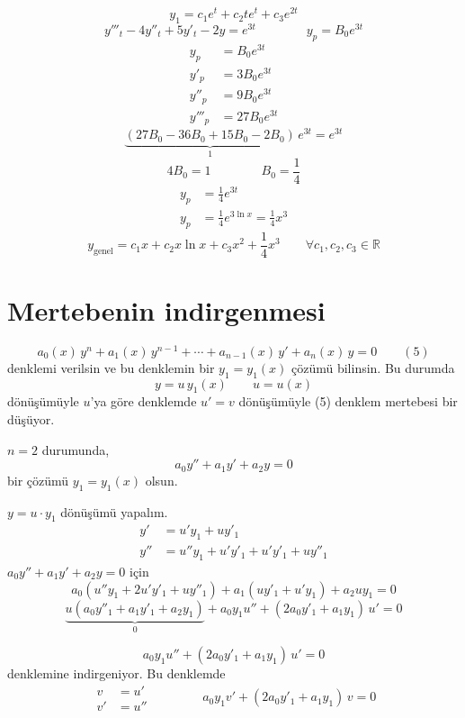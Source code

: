 \documentclass[11pt,a4paper]{article}
\begin{document}
\[ y_1 = c_1e^t + c_2te^t + c_3e^{2t} \]
\[ y'''_t - 4y''_t + 5y'_t - 2y = e^{3t} \qquad\qquad y_p = B_0e^{3t} \]
\begin{align*}
y_p &= B_0e^{3t}\\
y'_p &= 3B_0e^{3t}\\
y''_p &= 9B_0e^{3t}\\
y'''_p &= 27B_0e^{3t}
\end{align*}
\[ \underbrace{(27B_0 - 36B_0 + 15B_0 - 2B_0)}_{1}\,e^{3t} = e^{3t} \]
\[ 4B_0 = 1 \qquad\qquad B_0 = \frac{1}{4} \]
\begin{align*}
y_p &= \frac{1}{4}e^{3t}\\
y_p &= \frac{1}{4}e^{3\ln x} = \frac{1}{4}x^3
\end{align*}
\[ y_{\text{genel}} = c_1x + c_2x\ln x + c_3x^2 + \frac{1}{4}x^3 \qquad \forall c_1,c_2,c_3\in\mathbb{R} \]

\section{Mertebenin indirgenmesi}
\[ a_0(x)\,y^{n} + a_1(x)\,y^{n-1} + \cdots + a_{n-1}(x)\,y' + a_n(x)\,y = 0 \qquad (5) \]
denklemi verilsin ve bu denklemin bir $y_1=y_1(x)$ çözümü bilinsin. Bu durumda
\[ y = u\,y_1(x) \qquad u=u(x) \]
dönüşümüyle $u$'ya göre denklemde $u'=v$ dönüşümüyle (5) denklem mertebesi bir düşüyor.

$n=2$ durumunda,
\[ a_0y'' + a_1y' + a_2y = 0 \]
bir çözümü $y_1=y_1(x)$ olsun.

$y = u\cdot y_1$ dönüşümü yapalım.
\begin{align*}
y' &= u'y_1 + uy'_1\\
y'' &= u''y_1 + u'y'_1 + u'y'_1 + uy''_1
\end{align*}
$a_0y'' + a_1y' + a_2y = 0$ için
\[ a_0(u''y_1 + 2u'y'_1 + uy''_1) + a_1(uy'_1 + u'y_1) + a_2uy_1 = 0 \]
\[ \underbrace{u(a_0y''_1 + a_1y'_1 + a_2y_1)}_{0} + a_0y_1u'' + (2a_0y'_1 + a_1y_1)\,u' = 0 \]

\[ a_0y_1u'' + (2a_0y'_1 + a_1y_1)\,u' = 0 \]
denklemine indirgeniyor. Bu denklemde
\[ \begin{aligned} v &= u'\\ v' &= u'' \end{aligned} \qquad\qquad a_0y_1v' + (2a_0y'_1 + a_1y_1)\,v = 0 \]
\end{document}
